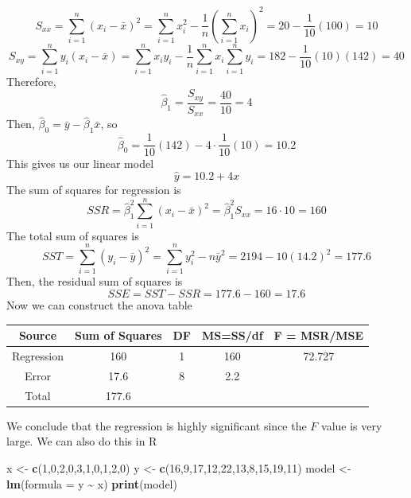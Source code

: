 \documentclass[
  11pt,
]{article}
\newenvironment{Shaded}{\begin{snugshade}}{\end{snugshade}}
\newcommand{\AttributeTok}[1]{\textcolor[rgb]{0.13,0.29,0.53}{#1}}
\newcommand{\DecValTok}[1]{\textcolor[rgb]{0.00,0.00,0.81}{#1}}
\newcommand{\FunctionTok}[1]{\textcolor[rgb]{0.13,0.29,0.53}{\textbf{#1}}}
\newcommand{\NormalTok}[1]{#1}
\newcommand{\OtherTok}[1]{\textcolor[rgb]{0.56,0.35,0.01}{#1}}
\newcommand{\SpecialCharTok}[1]{\textcolor[rgb]{0.81,0.36,0.00}{\textbf{#1}}}
\begin{document}
\[S_{xx} = \sum_{i=1}^n (x_i-\bar{x})^2 = \sum_{i=1}^n x_i^2 - \frac{1}{n}\left(\sum_{i=1}^n x_i\right)^2 = 20 - \frac{1}{10}(100) = 10\]
\[S_{xy} = \sum_{i=1}^n y_i(x_i - \bar{x}) = \sum_{i=1}^n x_iy_i - \frac{1}{n}\sum_{i=1}^n x_i \sum_{i=1}^n y_i  = 182 - \frac{1}{10}(10)(142) = 40\]
Therefore, \[\hat{\beta}_1 = \frac{S_{xy}}{S_{xx}} = \frac{40}{10} = 4\]
Then, \(\hat{\beta}_0 = \bar{y} - \hat{\beta}_1\bar{x}\), so
\[\hat{\beta}_0 = \frac{1}{10}(142) - 4\cdot \frac{1}{10}(10) = 10.2\]
This gives us our linear model \[\hat{y} = 10.2 + 4x\] The sum of
squares for regression is
\[SSR = \hat{\beta}_1^2 \sum_{i=1}^n (x_i - \bar{x})^2 = \hat{\beta}_1^2 S_{xx} = 16 \cdot 10 = 160 \]
The total sum of squares is
\[SST = \sum_{i=1}^n (y_i-\bar{y})^2 = \sum_{i=1}^n y_i^2 - n\bar{y}^2 =  2194 - 10(14.2)^2 = 177.6\]
Then, the residual sum of squares is
\[SSE = SST - SSR = 177.6 - 160 = 17.6\] Now we can construct the anova
table

\begin{center}
    \begin{tabular}{|c|c|c|c|c|}
        \hline
        Source & Sum of Squares & DF & MS=SS/df & F = MSR/MSE\\
        \hline
        Regression & 160 & 1 & 160 & 72.727  \\
        Error & 17.6 & 8 & 2.2 & \\
        Total & 177.6 & & & \\
        \hline
    \end{tabular}
\end{center}

We conclude tbat the regression is highly significant since the \(F\)
value is very large. We can also do this in R

\begin{Shaded}
\begin{Highlighting}[]
\NormalTok{x }\OtherTok{\textless{}{-}} \FunctionTok{c}\NormalTok{(}\DecValTok{1}\NormalTok{,}\DecValTok{0}\NormalTok{,}\DecValTok{2}\NormalTok{,}\DecValTok{0}\NormalTok{,}\DecValTok{3}\NormalTok{,}\DecValTok{1}\NormalTok{,}\DecValTok{0}\NormalTok{,}\DecValTok{1}\NormalTok{,}\DecValTok{2}\NormalTok{,}\DecValTok{0}\NormalTok{)}
\NormalTok{y }\OtherTok{\textless{}{-}} \FunctionTok{c}\NormalTok{(}\DecValTok{16}\NormalTok{,}\DecValTok{9}\NormalTok{,}\DecValTok{17}\NormalTok{,}\DecValTok{12}\NormalTok{,}\DecValTok{22}\NormalTok{,}\DecValTok{13}\NormalTok{,}\DecValTok{8}\NormalTok{,}\DecValTok{15}\NormalTok{,}\DecValTok{19}\NormalTok{,}\DecValTok{11}\NormalTok{)}
\NormalTok{model }\OtherTok{\textless{}{-}} \FunctionTok{lm}\NormalTok{(}\AttributeTok{formula =}\NormalTok{ y }\SpecialCharTok{\textasciitilde{}}\NormalTok{ x)}
\FunctionTok{print}\NormalTok{(model)}
\end{Highlighting}
\end{Shaded}
\end{document}
